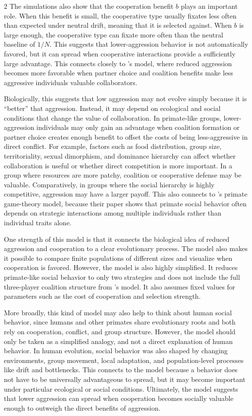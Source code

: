 \documentclass[11pt]{article}
\begin{document}
\begin{multicols}{2}
The simulations also show that the cooperation benefit $b$ plays an important role. When this benefit is small, the cooperative type usually fixates less often than expected under neutral drift, meaning that it is selected against. When $b$ is large enough, the cooperative type can fixate more often than the neutral baseline of $1/N$. This suggests that lower-aggression behavior is not automatically favored, but it can spread when cooperative interactions provide a sufficiently large advantage. This connects closely to \cite{Ihara2020}'s model, where reduced aggression becomes more favorable when partner choice and coalition benefits make less aggressive individuals valuable collaborators. 

Biologically, this suggests that low aggression may not evolve simply because it is ``better'' that aggression. Instead, it may depend on ecological and social conditions that change the value of collaboration. In primate-like groups, lower-aggression individuals may only gain an advantage when coalition formation or partner choice creates enough benefit to offset the costs of being less-aggressive in direct conflict. For example, factors such as food distribution, group size, territoriality, sexual dimorphism, and dominance hierarchy can affect whether collaboration is useful or whether direct competition is more important. In a group where resources are more patchy, coalition or cooperative defense may be valuable. Comparatively, in groups where the social hierarchy is highly competitive, aggression may have a larger payoff. This also connects to \cite{Lyon2011}'s primate game-theory model, because their paper shows that primate social behavior often depends on strategic interactions among multiple individuals rather than individual traits alone. 

One strength of this model is that it connects the biological idea of reduced aggression and cooperation to a clear evolutionary process. The model also makes it possible to compare finite populations of different sizes and visualize when cooperation is favored. However, the model is also highly simplified. It reduces primate-like social behavior to only two strategies and does not include the full three-player coalition structure from \cite{Ihara2020}'s model. It also assumes fixed values for parameters such as the cost of cooperation and selection strength. 

More broadly, this kind of model may also help to think about human social behavior, since humans and other primates share evolutionary roots and both rely on cooperation, conflict, and group structure. However, the model should only be taken as a simplified analogy, and not a direct explanation of human behavior. In human evolution, social behavior was also shaped by changing environments, group movement, local adaptation, and population-level processes like drift and bottlenecks. This connects to the model because a behavior does not have to be universally advantageous to spread, but it may become important under particular ecological or social conditions. Ultimately, the model suggests that lower aggression can spread when cooperation becomes socially valuable enough to outweigh the direct benefits of aggression.


\end{multicols}
\end{document}
